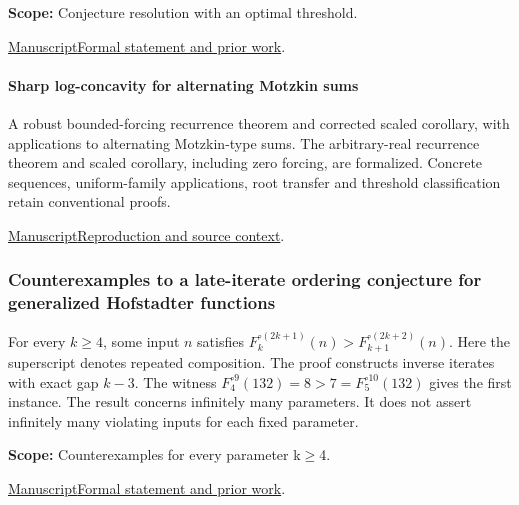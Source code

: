\documentclass[11pt,a4paper]{article}
\begin{document}
\par\smallskip

\noindent\textbf{Scope:} Conjecture resolution with an optimal threshold.

\par\smallskip

\noindent\href{https://github.com/dvgyl/math-and-theory/blob/main/papers/mathematics/motzkin/paper.pdf}{Manuscript}\quad\href{https://github.com/dvgyl/math-and-theory/blob/main/lean/docs/mathematics/motzkin.md}{Formal statement and prior work}.

\paragraph{Sharp log-concavity for alternating Motzkin sums} A robust bounded-forcing recurrence theorem and corrected scaled corollary, with applications to alternating Motzkin-type sums. The arbitrary-real recurrence theorem and scaled corollary, including zero forcing, are formalized. Concrete sequences, uniform-family applications, root transfer and threshold classification retain conventional proofs.

\href{https://github.com/dvgyl/math-and-theory/blob/main/papers/mathematics/motzkin/bounded-forcing/manuscript.pdf}{Manuscript}\quad\href{https://github.com/dvgyl/math-and-theory/blob/main/papers/mathematics/motzkin/bounded-forcing/README.md}{Reproduction and source context}.

\subsubsection{Counterexamples to a late-iterate ordering conjecture for generalized Hofstadter functions}

For every $k\geq4$, some input $n$ satisfies $F_k^{\circ(2k+1)}(n)>F_{k+1}^{\circ(2k+2)}(n)$. Here the superscript denotes repeated composition. The proof constructs inverse iterates with exact gap $k-3$. The witness $F_4^{\circ9}(132)=8>7=F_5^{\circ10}(132)$ gives the first instance. The result concerns infinitely many parameters. It does not assert infinitely many violating inputs for each fixed parameter.

\par\smallskip

\noindent\textbf{Scope:} Counterexamples for every parameter k$\geq$4.

\par\smallskip

\noindent\href{https://github.com/dvgyl/math-and-theory/blob/main/papers/mathematics/hofstadter-iteration/paper.pdf}{Manuscript}\quad\href{https://github.com/dvgyl/math-and-theory/blob/main/lean/docs/mathematics/hofstadter-iteration.md}{Formal statement and prior work}.
\end{document}
